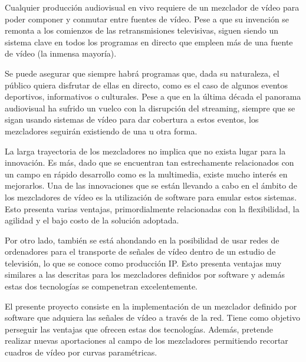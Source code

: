 \documentclass[../main.tex]{subfiles}
\begin{document}
Cualquier producción audiovisual en vivo requiere de un mezclador de vídeo para poder componer y conmutar entre fuentes de vídeo. Pese a que su invención se remonta a los comienzos de las retransmisiones televisivas, siguen siendo un sistema clave en todos los programas en directo que empleen más de una fuente de vídeo (la inmensa mayoría).\newline

Se puede asegurar que siempre habrá programas que, dada su naturaleza, el público quiera disfrutar de ellas en directo, como es el caso de algunos eventos deportivos, informativos o culturales. Pese a que en la última década el panorama audiovisual ha sufrido un vuelco con la disrupción del streaming, siempre que se sigan usando sistemas de vídeo para dar cobertura a estos eventos, los mezcladores seguirán existiendo de una u otra forma.\newline

La larga trayectoria de los mezcladores no implica que no exista lugar para la innovación. Es más, dado que se encuentran tan estrechamente relacionados con un campo en rápido desarrollo como es la multimedia, existe mucho interés en mejorarlos. Una de las innovaciones que se están llevando a cabo en el ámbito de los mezcladores de vídeo es la utilización de software para emular estos sistemas. Esto presenta varias ventajas, primordialmente relacionadas con la flexibilidad, la agilidad y el bajo costo de la solución adoptada.\newline  

Por otro lado, también se está ahondando en la posibilidad de usar redes de ordenadores para el transporte de señales de vídeo dentro de un estudio de televisión, lo que se conoce como producción IP. Esto presenta ventajas muy similares a las descritas para los mezcladores definidos por software y además estas dos tecnologías se compenetran excelentemente.\newline

El presente proyecto consiste en la implementación de un mezclador definido por software que adquiera las señales de vídeo a través de la red. Tiene como objetivo perseguir las ventajas que ofrecen estas dos tecnologías. Además, pretende realizar nuevas aportaciones al campo de los mezcladores permitiendo recortar cuadros de vídeo por curvas paramétricas.\newline
\end{document}
